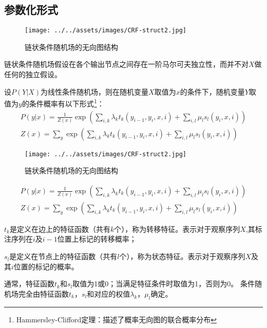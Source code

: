 \documentclass[9pt,aspectratio=169]{ctexbeamer}
\begin{document}
	\subsection{参数化形式}
	\begin{frame}

	

		\begin{figure}
			\centering
			\texttt{[image: ../../assets/images/CRF-struct2.jpg]}
			\caption{链状条件随机场的无向图结构}
		\end{figure}
	
		链状条件随机场假设在各个输出节点之间存在一阶马尔可夫独立性，而并不对$X$做任何的独立假设。
		
		设$P(Y|X)$为线性条件随机场，则在随机变量$X$取值为$x$的条件下，随机变量$Y$取值为$y$的条件概率有以下形式\footnote{Hammersley-Clifford定理：描述了概率无向图的联合概率分布}：
		\begin{gather}
			P(y|x) = \frac{1}{Z(x)}\exp\left(\sum_{i,k}\lambda_{k}t_{k}\left(y_{i-1},y_{i},x,i\right)+\sum_{i,l}\mu_ls_l\left(y_{i},x,i\right)\right) \\
			Z({x}) = \sum_y\exp\left(\sum_{i,k}\lambda_{k}t_{k}\left(y_{i-1},y_{i},x,i\right)+\sum_{i,l}\mu_ls_l\left(y_{i},x,i\right)\right)
		\end{gather}
	\end{frame}
	
	\begin{frame}
		\begin{figure}
			\centering
			\texttt{[image: ../../assets/images/CRF-struct2.jpg]}
			\caption{链状条件随机场的无向图结构}
		\end{figure}
		\begin{gather*}
		P(y|x) = \frac{1}{Z(x)}\exp\left(\sum_{i,k}\lambda_{k}t_{k}\left(y_{i-1},y_{i},x,i\right)+\sum_{i,l}\mu_ls_l\left(y_{i},x,i\right)\right) \\
		Z({x}) = \sum_y\exp\left(\sum_{i,k}\lambda_{k}t_{k}\left(y_{i-1},y_{i},x,i\right)+\sum_{i,l}\mu_ls_l\left(y_{i},x,i\right)\right)
		\end{gather*}
		
		$ t_{k} $是定义在边上的特征函数（共有$ k $个），称为转移特征。表示对于观察序列$ X $,其标注序列在$ i $及$ i-1 $位置上标记的转移概率；
		
		$ s_{l} $是定义在节点上的特征函数（共有$ l $个），称为状态特征。表示对于观察序列$ X $及其$ i $位置的标记的概率。
		
		通常，特征函数$t_{k}$和$s_{l}$取值为1或0；当满足特征条件时取值为1，否则为0。
		条件随机场完全由特征函数$t_{k}$，$s_{l}$和对应的权值$\lambda_{k}$，$\mu_{l}$确定。
	\end{frame}
\end{document}

